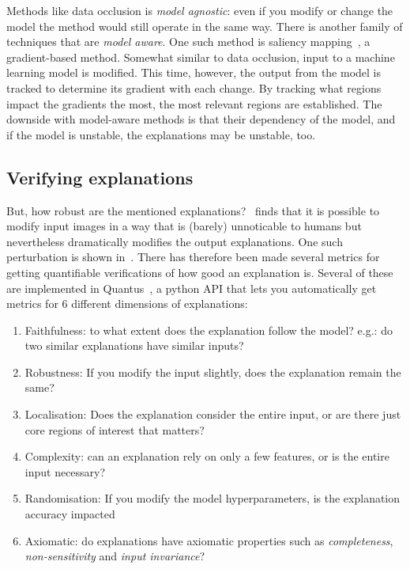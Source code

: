 \documentclass[10pt,twocolumn,letterpaper]{article}
\begin{document}
Methods like data occlusion is \textit{model agnostic}: even if you modify or change the model the method would still operate in the same way. There is another family of techniques that are \textit{model aware}. One such method is saliency mapping~\cite{simonyan2014deep}, a gradient-based method. Somewhat similar to data occlusion, input to a machine learning model is modified. This time, however, the output from the model is tracked to determine its gradient with each change. By tracking what regions impact the gradients the most, the most relevant regions are established. The downside with model-aware methods is that their dependency of the model, and if the model is unstable, the explanations may be unstable, too.

\subsection{Verifying explanations}
But, how robust are the mentioned explanations?~\cite{geometryToBlame} finds that it is possible to modify input images in a way that is (barely) unnoticable to humans but nevertheless dramatically modifies the output explanations. One such perturbation is shown in~. There has therefore been made several metrics for getting quantifiable verifications of how good an explanation is. Several of these are implemented in Quantus~\cite{hedstrom2023quantus}, a python API that lets you automatically get metrics for 6 different dimensions of explanations:
\begin{enumerate}
  \item Faithfulness: to what extent does the explanation follow the model? e.g.: do two similar explanations have similar inputs?
  \item Robustness: If you modify the input slightly, does the explanation remain the same?
  \item Localisation: Does the explanation consider the entire input, or are there just core regions of interest that matters?
  \item Complexity: can an explanation rely on only a few features, or is the entire input necessary?
  \item Randomisation: If you modify the model hyperparameters, is the explanation accuracy impacted
  \item Axiomatic: do explanations have axiomatic properties such as \textit{completeness}, \textit{non-sensitivity} and \textit{input invariance}?
\end{enumerate}
\end{document}

